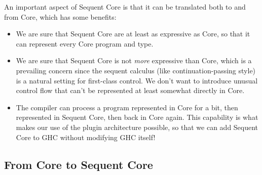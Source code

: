 \documentclass{article}
\begin{document}
An important aspect of Sequent Core is that it can be translated both to and
from Core, which has some benefits:
\begin{itemize}
\item We are sure that Sequent Core are at least as expressive as Core, so that
  it can represent every Core program and type.
\item We are sure that Sequent Core is not \emph{more} expressive than Core,
  which is a prevailing concern since the sequent calculus (like
  continuation-passing style) is a natural setting for first-class control.  We
  don't want to introduce unusual control flow that can't be represented at
  least somewhat directly in Core.
\item The compiler can process a program represented in Core for a bit, then
  represented in Sequent Core, then back in Core again.  This capability is what
  makes our use of the plugin architecture possible, so that we can add Sequent
  Core to GHC without modifying GHC itself!
\end{itemize}

\subsection{From Core to Sequent Core}
\end{document}
